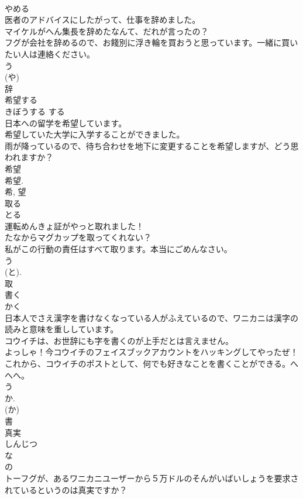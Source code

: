 \documentclass[8pt]{extreport}
\begin{document}
\begin{CJK}{UTF8}{min}
\\	やめる	
\\	医者のアドバイスにしたがって、仕事を辞めました。	
\\	マイケルがへん集長を辞めたなんて、だれが言ったの？	
\\	フグが会社を辞めるので、お餞別に浮き輪を買おうと思っています。一緒に買いたい人は連絡ください。	
\\	う 
\\	(や) 
\\	辞	
\\	希望する	
\\	きぼうする	する 
\\	日本への留学を希望しています。	
\\	希望していた大学に入学することができました。	
\\	雨が降っているので、待ち合わせを地下に変更することを希望しますが、どう思われますか？	
\\	希望 
\\	希望. 
\\	希, 望	
\\	取る	
\\	とる	
\\	運転めんきょ証がやっと取れました！	
\\	たなからマグカップを取ってくれない？	
\\	私がこの行動の責任はすべて取ります。本当にごめんなさい。	
\\	う 
\\	(と). 
\\	取	
\\	書く	
\\	かく	
\\	日本人でさえ漢字を書けなくなっている人がふえているので、ワニカニは漢字の読みと意味を重ししています。	
\\	コウイチは、お世辞にも字を書くのが上手だとは言えません。	
\\	よっしゃ！今コウイチのフェイスブックアカウントをハッキングしてやったぜ！これから、コウイチのポストとして、何でも好きなことを書くことができる。へへへ。	
\\	う 
\\	か. 
\\	(か) 
\\	書	
\\	真実	
\\	しんじつ	
\\	な 
\\	の 
\\	トーフグが、あるワニカニユーザーから５万ドルのそんがいばいしょうを要求されているというのは真実ですか？	

\end{CJK}
\end{document}
